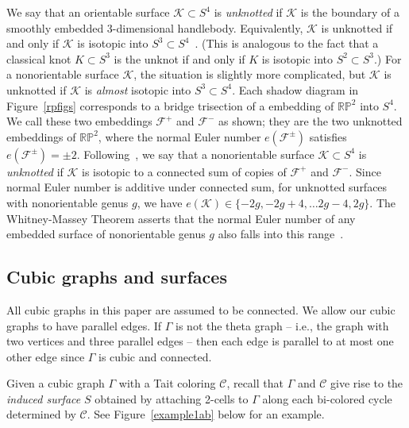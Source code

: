\documentclass[11pt, oneside]{amsart}
\theoremstyle{theorem}
\theoremstyle{definition}
\newcommand{\F}{\mathcal{F}}
\newcommand{\RP}{\mathbb{RP}}
\newcommand{\K}{\mathcal{K}}
\theoremstyle{theorem}
\begin{document}
We say that an orientable surface $\K \subset S^4$ is \emph{unknotted} if $\K$ is the boundary of a smoothly embedded 3-dimensional handlebody.  Equivalently, $\K$ is unknotted if and only if $\K$ is isotopic into $S^3\subset S^4$~\cite[Theorem 1.2]{KH}. (This is analogous to the fact that a classical knot $K \subset S^3$ is the unknot if and only if $K$ is isotopic into $S^2\subset S^3$.)  For a nonorientable surface $\K$, the situation is slightly more complicated, but $\K$ is unknotted if $\K$ is \emph{almost} isotopic into $S^3\subset S^4$.  Each shadow diagram in Figure~\ref{rpfigs} corresponds to a bridge trisection of a embedding of $\RP^2$ into $S^4$.  We call these two embeddings $\F^+$ and $\F^-$ as shown; they are the two unknotted embeddings of $\RP^2$, where the normal Euler number $e(\F^{\pm})$ satisfies $e(\F^{\pm}) = \pm 2$.  Following~\cite{KH}, we say that a nonorientable surface $\K \subset S^4$ is \emph{unknotted} if $\K$ is isotopic to a connected sum of copies of $\F^+$ and $\F^-$.  Since normal Euler number is additive under connected sum, for unknotted surfaces with nonorientable genus $g$, we have $e(\K) \in \{-2g, -2g + 4,\dots 2g -4 , 2g\}$.  The Whitney-Massey Theorem asserts that the normal Euler number of any embedded surface of nonorientable genus $g$ also falls into this range~\cite{Massey}.


\subsection{Cubic graphs and surfaces}

All cubic graphs in this paper are assumed to be connected.  We allow our cubic graphs to have parallel edges.  If $\Gamma$ is not the theta graph -- i.e., the graph with two vertices and three parallel edges -- then each edge is parallel to at most one other edge since $\Gamma$ is cubic and connected.

Given a cubic graph $\Gamma$ with a Tait coloring $\mathcal{C}$, recall that $\Gamma$ and $\mathcal{C}$ give rise to the \emph{induced surface} $S$ obtained by attaching 2-cells to $\Gamma$ along each bi-colored cycle determined by $\mathcal{C}$.  See Figure~\ref{example1ab} below for an example.
\end{document}
